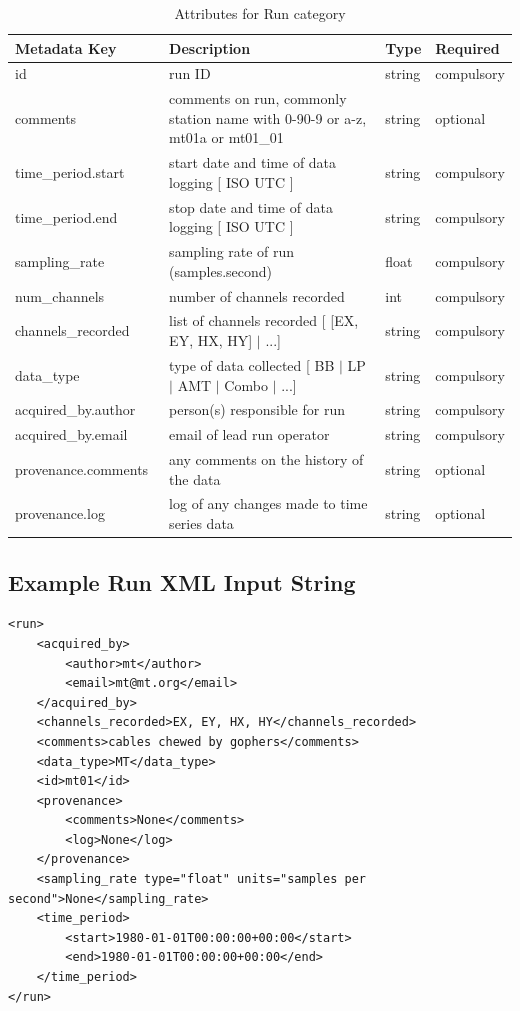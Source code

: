 \documentclass{article}
\begin{document}
\begin{table}[htb!]
    \caption[Attributes for Run]{Attributes for Run category}
    \begin{tabular}{|l|p{3.6in}|l|l|}
        \hline
        \textbf{Metadata Key} & \textbf{Description} & \textbf{Type} & \textbf{Required} \\ \hline
        id\ & run ID & string & compulsory \\ \hline
        comments\ & comments on run, commonly station name with {0-9}{0-9} or {a-z}, mt01a or mt01\_01 & string & optional \\ \hline
        time\_period.start\ & start date and time of data logging [ ISO UTC ] & string & compulsory \\ \hline
        time\_period.end\ & stop date and time of data logging [ ISO UTC ] & string & compulsory \\ \hline
        sampling\_rate\ & sampling rate of run (samples.second) & float & compulsory \\ \hline
        num\_channels\ & number of channels recorded & int & compulsory \\ \hline
        channels\_recorded\ & list of channels recorded [ [EX, EY, HX, HY] $|$ ...] & string & compulsory \\ \hline
        data\_type \ & type of data collected [ BB $|$ LP $|$ AMT $|$ Combo $|$ ...] & string & compulsory \\ \hline
        acquired\_by.author\ & person(s) responsible for run & string & compulsory \\ \hline
        acquired\_by.email\ & email of lead run operator & string & compulsory \\ \hline
        provenance.comments\ & any comments on the history of the data & string & optional \\ \hline
        provenance.log\ & log of any changes made to time series data & string & optional \\ \hline
    \end{tabular}
    \label{tab:run}
\end{table}

\subsection{Example Run XML Input String}

\begin{verbatim}
<run>
    <acquired_by>
        <author>mt</author>
        <email>mt@mt.org</email>
    </acquired_by>
    <channels_recorded>EX, EY, HX, HY</channels_recorded>
    <comments>cables chewed by gophers</comments>
    <data_type>MT</data_type>
    <id>mt01</id>
    <provenance>
        <comments>None</comments>
        <log>None</log>
    </provenance>
    <sampling_rate type="float" units="samples per second">None</sampling_rate>
    <time_period>
        <start>1980-01-01T00:00:00+00:00</start>
        <end>1980-01-01T00:00:00+00:00</end>
    </time_period>
</run>
\end{verbatim}
\end{document}

